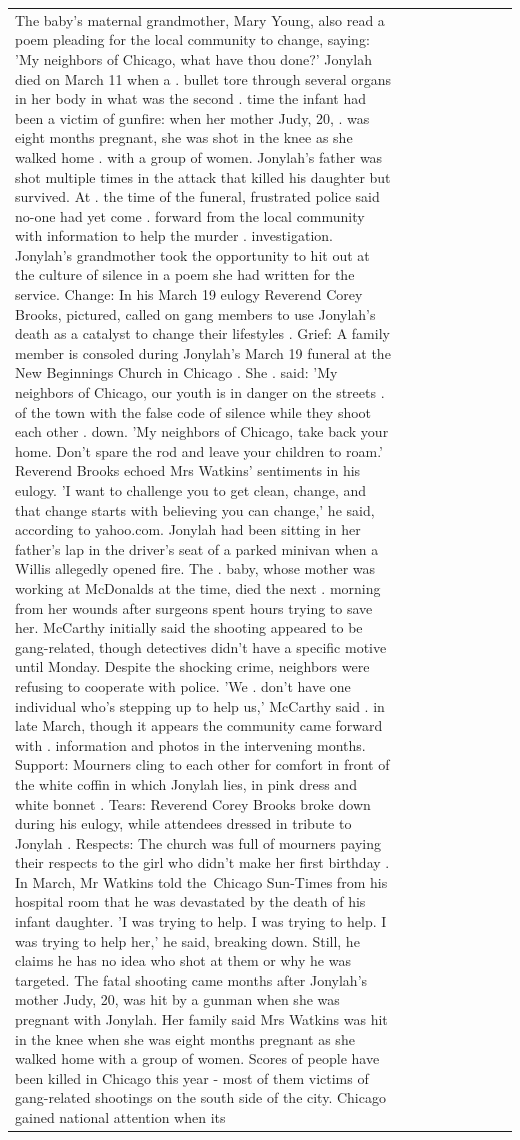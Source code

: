 \begin{table}[H]
\begin{tabular}{lllrlllll}
The baby's maternal grandmother, Mary Young, also read a poem pleading for the local community to change, saying: 'My neighbors of Chicago, what have thou done?' Jonylah died on March 11 when a . bullet tore through several organs in her body in what was the second . time the infant had been a victim of gunfire: when her mother Judy, 20, . was eight months pregnant, she was shot in the knee as she walked home . with a group of women. Jonylah's father was shot multiple times in the attack that killed his daughter but survived. At . the time of the funeral, frustrated police said no-one had yet come . forward from the local community with information to help the murder . investigation. Jonylah's grandmother took the opportunity to hit out at the culture of silence in a poem she had written for the service. Change: In his March 19 eulogy Reverend Corey Brooks, pictured, called on gang members to use Jonylah's death as a catalyst to change their lifestyles . Grief: A family member is consoled during Jonylah's March 19 funeral at the New Beginnings Church in Chicago . She . said: 'My neighbors of Chicago, our youth is in danger on the streets . of the town with the false code of silence while they shoot each other . down. 'My neighbors of Chicago, take back your home. Don't spare the rod and leave your children to roam.' Reverend Brooks echoed Mrs Watkins' sentiments in his eulogy. 'I want to challenge you to get clean, change, and that change starts with believing you can change,' he said, according to yahoo.com. Jonylah had been sitting in her father's lap in the driver's seat of a parked minivan when a Willis allegedly opened fire. The . baby, whose mother was working at McDonalds at the time, died the next . morning from her wounds after surgeons spent hours trying to save her. McCarthy initially said the shooting appeared to be gang-related, though detectives didn't have a specific motive until Monday. Despite the shocking crime, neighbors were refusing to cooperate with police. 'We . don't have one individual who's stepping up to help us,' McCarthy said . in late March, though it appears the community came forward with . information and photos in the intervening months. Support: Mourners cling to each other for comfort in front of the white coffin in which Jonylah lies, in pink dress and white bonnet . Tears: Reverend Corey Brooks broke down during his eulogy, while attendees dressed in tribute to Jonylah . Respects: The church was full of mourners paying their respects to the girl who didn't make her first birthday . In March, Mr Watkins told the Chicago Sun-Times from his hospital room that he was devastated by the death of his infant daughter. 'I was trying to help. I was trying to help. I was trying to help her,' he said, breaking down. Still, he claims he has no idea who shot at them or why he was targeted. The fatal shooting came months after Jonylah's mother Judy, 20, was hit by a gunman when she was pregnant with Jonylah. Her family said Mrs Watkins was hit in the knee when she was eight months pregnant as she walked home with a group of women. Scores of people have been killed in Chicago this year - most of them victims of gang-related shootings on the south side of the city. Chicago gained national attention when its 
\end{tabular}
\end{table}
